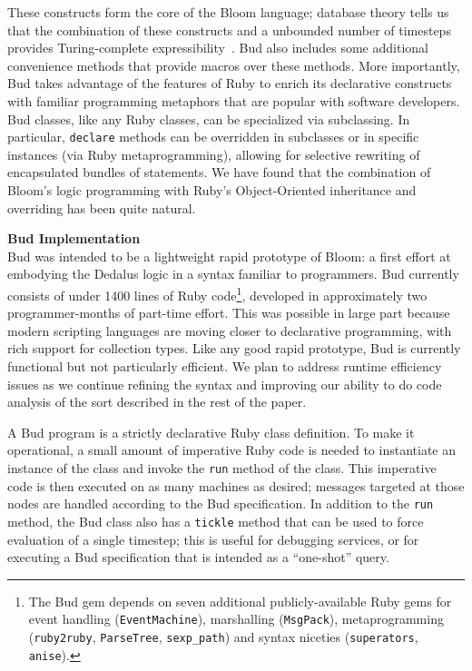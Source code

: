 These constructs form the core of the Bloom language; database theory tells us that the combination of these constructs and a unbounded number of timesteps provides Turing-complete expressibility~\cite{christospaper}.  Bud also includes some additional convenience methods that provide macros over these methods.  More importantly, Bud takes advantage of the features of Ruby to enrich its declarative constructs with familiar programming metaphors that are popular with software developers.  Bud classes, like any Ruby classes, can be specialized via subclassing.  In particular, {\tt declare} methods can be overridden in subclasses or in specific instances (via Ruby metaprogramming), allowing for selective rewriting of encapsulated bundles of statements.  We have found that the combination of Bloom's logic programming with Ruby's Object-Oriented inheritance and overriding has been quite natural.

{\bf Bud Implementation}\\
Bud was intended to be a lightweight rapid prototype of Bloom: a first effort at embodying the Dedalus logic in a syntax familiar to programmers.  Bud currently consists of under 1400 lines of Ruby code\footnote{The Bud gem depends on seven additional publicly-available Ruby gems for event handling ({\tt EventMachine}), marshalling ({\tt MsgPack}), metaprogramming ({\tt ruby2ruby}, {\tt ParseTree}, {\tt sexp\_path}) and syntax niceties ({\tt superators}, {\tt anise}).}, developed in approximately two programmer-months of part-time effort.  This was possible in large part because modern scripting languages are moving closer to declarative programming, with rich support for collection types.  Like any good rapid prototype, Bud is currently functional but not particularly efficient.  We plan to address runtime efficiency issues as we continue refining the syntax and improving our ability to do code analysis of the sort described in the rest of the paper.

A Bud program is a strictly declarative Ruby class definition.  To make it operational, a small amount of imperative Ruby code is needed to instantiate an instance of the class and invoke the {\tt run} method of the class.  This imperative code is then executed on as many machines as desired; messages targeted at those nodes are handled according to the Bud specification.  In addition to the {\tt run} method, the Bud class also has a {\tt tickle} method that can be used to force evaluation of a single timestep; this is useful for debugging services, or for executing a Bud specification that is intended as a ``one-shot'' query.


